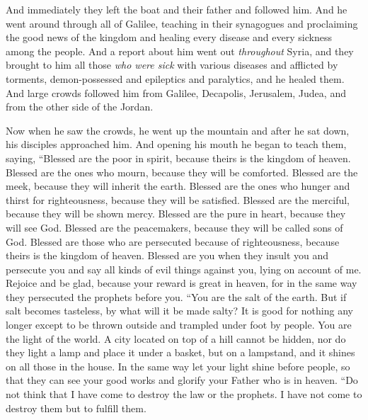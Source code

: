 \begin{biblechapter}
\verse And immediately they left the boat and their father and followed him.
 And he went around through all of Galilee, teaching in their synagogues and proclaiming the good news of the kingdom and healing every disease and every sickness among the people.
\verse And a report about him went out \textit{throughout} Syria, and they brought to him all those \textit{who were sick} with various diseases and afflicted by torments, demon-possessed and epileptics and paralytics, and he healed them.
\verse And large crowds followed him from Galilee, Decapolis, Jerusalem, Judea, and from the other side of the Jordan.
\end{biblechapter}

\begin{biblechapter} %
 Now when he saw the crowds, he went up the mountain and after he sat down, his disciples approached him.
\verse And opening his mouth he began to teach them, saying,
\verse “Blessed are the poor in spirit, 
because theirs is the kingdom of heaven.
\verse Blessed are the ones who mourn, 
because they will be comforted.
\verse Blessed are the meek, 
because they will inherit the earth.
\verse Blessed are the ones who hunger and thirst for righteousness, 
because they will be satisfied.
\verse Blessed are the merciful, 
because they will be shown mercy.
\verse Blessed are the pure in heart, 
because they will see God.
\verse Blessed are the peacemakers, 
because they will be called sons of God.
\verse Blessed are those who are persecuted because of righteousness, 
because theirs is the kingdom of heaven.
\verse Blessed are you 
when they insult you and persecute you and say all kinds of evil things against you, lying on account of me.
\verse Rejoice and be glad, because your reward is great in heaven, for in the same way they persecuted the prophets before you.
 “You are the salt of the earth. But if salt becomes tasteless, by what will it be made salty? It is good for nothing any longer except to be thrown outside and trampled under foot by people.
\verse You are the light of the world. A city located on top of a hill cannot be hidden,
\verse nor do they light a lamp and place it under a basket, but on a lampstand, and it shines on all those in the house.
\verse In the same way let your light shine before people, so that they can see your good works and glorify your Father who is in heaven.
 “Do not think that I have come to destroy the law or the prophets. I have not come to destroy them but to fulfill them.

\end{biblechapter}
